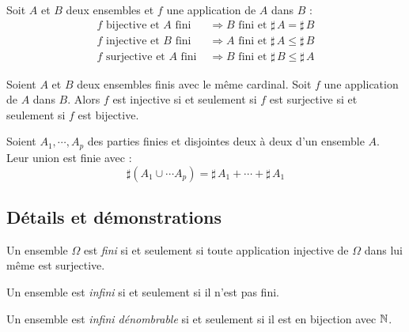 \begin{propn}\label{pN: PropAppFin}
 Soit $A$ et $B$ deux ensembles et $f$ une application de $A$ dans $B$ :
\begin{align*}
 f \text{ bijective et } A \text{ fini }   &\Rightarrow B \text{ fini et } \sharp\, A = \sharp\, B \\
 f \text{ injective et } B \text{ fini }  &\Rightarrow A \text{ fini et } \sharp\, A \leq \sharp\, B \\
 f \text{ surjective et } A \text{ fini } &\Rightarrow B \text{ fini et } \sharp\, B \leq \sharp\, A 
\end{align*}
\end{propn}

\begin{propn}\label{pN: CarBij}
Soient $A$ et $B$ deux ensembles finis avec le même cardinal. Soit $f$ une application de $A$ dans $B$. Alors $f$ est injective si et seulement si $f$ est surjective si et seulement si $f$ est bijective.
\end{propn}

\begin{propn}\label{pN: SomCard}
 Soient $A_1,\cdots,A_p$ des parties finies et disjointes deux à deux d'un ensemble $A$. Leur union est finie avec :
\begin{displaymath}
 \sharp\left(A_1 \cup \cdots A_p \right) = \sharp\, A_1 + \cdots + \sharp\, A_1 
\end{displaymath}
\end{propn}

\subsection{Détails et démonstrations}
\begin{defi}
 Un ensemble $\Omega$ est \emph{fini} si et seulement si toute application injective de $\Omega$ dans lui même est surjective.
\end{defi}

\begin{defi}
Un ensemble est \emph{infini} si et seulement si il n'est pas fini.
\end{defi}

\begin{defi}
Un ensemble est \emph{infini dénombrable} si et seulement si il est en bijection avec $\mathbb{N}$.
\end{defi}


